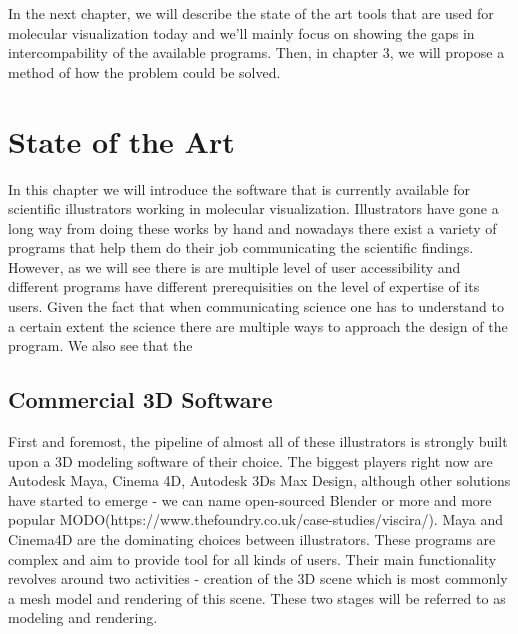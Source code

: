 \documentclass[
  digital, %
  table,   %
  nolof,     %
  nolot,     %
]{fithesis3}
\begin{document}
In the next chapter, we will describe the state of the art tools that are used for molecular visualization today and we'll mainly focus on showing the gaps in intercompability of the available programs. Then, in chapter 3, we will propose a method of how the problem could be solved.

\chapter{State of the Art}

In this chapter we will introduce the software that is currently available for scientific illustrators working in molecular visualization. Illustrators have gone a long way from doing these works by hand and nowadays there exist a variety of programs that help them do their job communicating the scientific findings. However, as we will see there is are multiple level of user accessibility and different programs have different prerequisities on the level of expertise of its users. Given the fact that when communicating science one has to understand to a certain extent the science there are multiple ways to approach the design of the program. We also see that the

\section{Commercial 3D Software}
First and foremost, the pipeline of almost all of these illustrators is strongly built upon a 3D modeling software of their choice. The biggest players right now are Autodesk Maya, Cinema 4D, Autodesk 3Ds Max Design, although other solutions have started to emerge - we can name open-sourced Blender or more and more popular MODO(https://www.thefoundry.co.uk/case-studies/viscira/). Maya and Cinema4D are the dominating choices between illustrators. These programs are complex and aim to provide tool for all kinds of users. Their main functionality revolves around two activities - creation of the 3D scene which is most commonly a mesh model and rendering of this scene. These two stages will be referred to as modeling and rendering.
\end{document}
